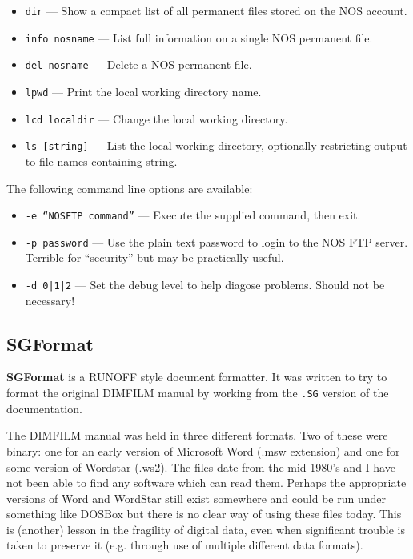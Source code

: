 \documentclass[a4paper,twoside,11pt]{article}
\newcommand{\newpara}{\par\vspace{4mm}\noindent}
\newcommand{\textttc}[1]{\texttt{\textcolor{OurRed}{#1}}}
\begin{document}
\begin{itemize}
\item \textttc{dir} --- Show a compact list of all permanent files stored on the NOS account.
\item \textttc{info nosname} --- List full information on a single NOS permanent file.
\item \textttc{del nosname} --- Delete a NOS permanent file.
\item \textttc{lpwd} --- Print the local working directory name.
\item \textttc{lcd localdir} --- Change the local working directory.
\item \textttc{ls [string]} --- List the local working directory, optionally restricting output
  to file names containing string.
\end{itemize}

\newpara
The following command line options are available:
\begin{itemize}
\item \textttc{-e ``NOSFTP command''} --- Execute the supplied command, then exit.
\item \textttc{-p password} --- Use the plain text password to login to the NOS FTP server. Terrible
  for ``security'' but may be practically useful.
\item \textttc{-d 0|1|2} --- Set the debug level to help diagose problems. Should not be necessary!
\end{itemize}

\subsection{SGFormat}
\newpara
\textbf{SGFormat} is a RUNOFF style document formatter. It  was written to
try to format the original DIMFILM manual
by working from the \texttt{.SG} version of the documentation.

\newpara
The DIMFILM manual was held in three different formats. Two of these were binary: one for an early
version of Microsoft Word (.msw extension) and one for some version of Wordstar (.ws2). The files date from the
mid-1980's and I have not been able to find any software which can read them. Perhaps the appropriate
versions of Word and WordStar still exist somewhere and could be run under something like DOSBox but
there is no clear way of using these files today. This is (another) lesson in the fragility of
digital data, even when significant trouble is taken to preserve it (e.g. through use of multiple
different data formats).
\end{document}
